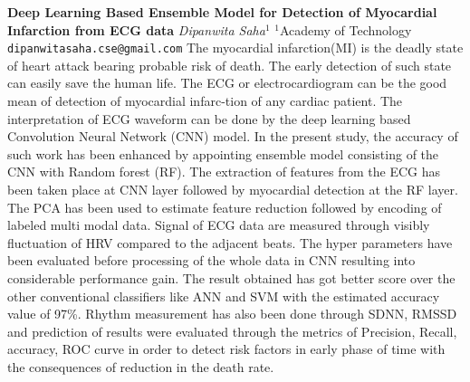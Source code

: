 
    \begin{conf-abstract}[]
        {\textbf{Deep Learning Based Ensemble Model for Detection of Myocardial Infarction from ECG data}}
        {\textit{Dipanwita Saha$^{1}$}}
        {$^{1}$Academy of Technology}
        {\texttt{dipanwitasaha.cse@gmail.com}}
        {The myocardial infarction(MI) is the deadly state of heart attack bearing probable risk of death. The early detection of such state can easily save the human life. The ECG or electrocardiogram can be the good mean of detection of myocardial infarc-tion of any cardiac patient. The interpretation of ECG waveform can be done by the deep learning based Convolution Neural Network (CNN) model. In the present study, the accuracy of such work has been enhanced by appointing ensemble model consisting of the CNN with Random forest (RF). The extraction of features from the ECG has been taken place at CNN layer followed by myocardial detection at the  RF layer. The PCA has been used to estimate feature reduction followed by encoding of labeled multi modal data. Signal of ECG data are measured through visibly fluctuation of HRV compared to the adjacent beats. The hyper parameters have been evaluated before processing of the whole data in CNN resulting into considerable performance gain. The result obtained has got better score over the other conventional classifiers like ANN and SVM with the estimated accuracy value of 97\%.  Rhythm measurement has also been done through SDNN, RMSSD and prediction of results were evaluated through the metrics of Precision, Recall, accuracy, ROC curve in order to detect risk factors in early phase of time with the consequences of reduction in  the death rate. }
    \end{conf-abstract}
        